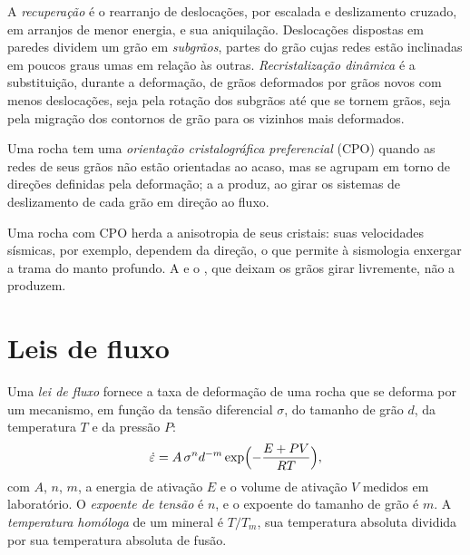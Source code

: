 \begin{definition}\label{def:b3:deformation-mechanisms:recrystallisation}
A \emph{recuperação} é o rearranjo de
deslocações, por escalada e deslizamento cruzado, em arranjos de menor energia, e sua
aniquilação. Deslocações dispostas em paredes dividem um grão em
\emph{subgrãos}, partes do grão cujas redes estão inclinadas
em poucos graus umas em relação às outras. \emph{Recristalização
dinâmica} é a substituição, durante
a deformação, de grãos deformados por grãos novos com menos deslocações, seja
pela rotação dos subgrãos até que se tornem grãos, seja pela migração dos
contornos de grão para os vizinhos mais deformados.
\end{definition}

\begin{definition}\label{def:b3:deformation-mechanisms:cpo}
Uma rocha tem uma \emph{orientação cristalográfica preferencial}
(CPO) quando as redes de seus grãos não estão orientadas
ao acaso, mas se agrupam em torno de direções definidas pela deformação; a 
a produz, ao girar os sistemas de deslizamento de cada grão em direção ao fluxo.
\end{definition}

Uma rocha com CPO herda a anisotropia de seus cristais: suas velocidades sísmicas,
por exemplo, dependem da direção, o que permite à sismologia enxergar a trama do
manto profundo. A  e o , que deixam os grãos
girar livremente, não a produzem.

\section{Leis de fluxo}

\begin{definition}\label{def:b3:deformation-mechanisms:flow-law}
Uma \emph{lei de fluxo} fornece a taxa de deformação de uma rocha que se deforma por
um mecanismo, em função da tensão diferencial $\sigma$, do tamanho de grão
$d$, da temperatura $T$ e da pressão $P$:
\[
  \dot\varepsilon = A\,\sigma^nd^{-m}\exp\Bigl(-\frac{E + PV}{RT}\Bigr),
\]
com $A$, $n$, $m$, a energia de ativação $E$ e o volume de ativação $V$
medidos em laboratório. O \emph{expoente de tensão}
é $n$, e o expoente do tamanho de grão é $m$. A \emph{temperatura
homóloga} de um mineral é $T/T_m$, sua
temperatura absoluta dividida por sua temperatura absoluta de fusão.
\end{definition}

